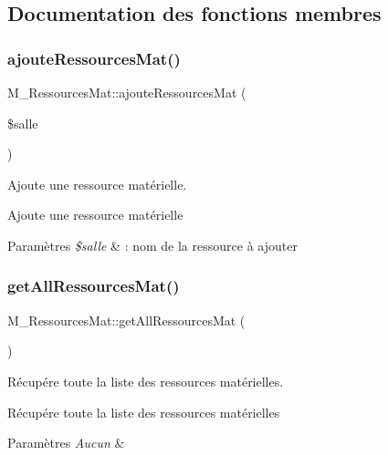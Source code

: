\subsection{Documentation des fonctions membres}
\mbox{\label{class_m___ressources_mat_af1001fa4d1abca848af86e58fbd2e297}} 
\subsubsection{\texorpdfstring{ajoute\+Ressources\+Mat()}{ajouteRessourcesMat()}}
{\footnotesize\ttfamily M\+\_\+\+Ressources\+Mat\+::ajoute\+Ressources\+Mat (\begin{DoxyParamCaption}\item[{}]{\$salle }\end{DoxyParamCaption})}



Ajoute une ressource matérielle. 

Ajoute une ressource matérielle 
\begin{DoxyParams}{Paramètres}
{\em \$salle} & \+: nom de la ressource à ajouter \\
\hline
\end{DoxyParams}
\mbox{\label{class_m___ressources_mat_aca0f140427dd888eb839c18e4e2ec2d9}} 
\subsubsection{\texorpdfstring{get\+All\+Ressources\+Mat()}{getAllRessourcesMat()}}
{\footnotesize\ttfamily M\+\_\+\+Ressources\+Mat\+::get\+All\+Ressources\+Mat (\begin{DoxyParamCaption}{ }\end{DoxyParamCaption})}



Récupére toute la liste des ressources matérielles. 

Récupére toute la liste des ressources matérielles 
\begin{DoxyParams}{Paramètres}
{\em Aucun} & \\
\hline
\end{DoxyParams}
\mbox{\label{class_m___ressources_mat_a14a2d603e9b876d51386f8ab26a86c99}} 
